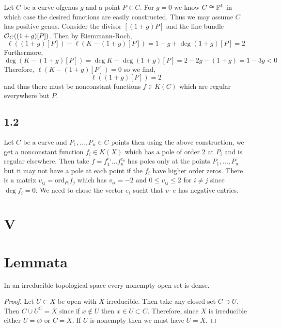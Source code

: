 \documentclass[12pt]{article}
\begin{document}
Let $C$ be a curve ofgenus $g$ and a point $P \in C$. For $g = 0$ we know $C \cong \P^1$ in which case the desired functions are easily constructed. Thus we may assume $C$ has positive genus. Consider the divisor $[(1 + g)P]$ and the line bundle $\struct{C}((1 + g)[P])$. Then by Riemmann-Roch,
\[ \ell((1 + g)[P]) - \ell(K - (1 + g)[P]) = 1 - g + \deg{(1 + g) [P]} = 2 \]
Furthermore,
\[ \deg{(K - (1+g)[P])} = \deg{K} - \deg{(1 + g)[P]} = 2 - 2g - (1 + g) = 1 - 3 g < 0 \]
Therefore, $\ell(K - (1 + g)[P]) = 0$ so we find,
\[ \ell((1 + g)[P]) = 2 \]
and thus there must be nonconstant functions $f \in K(C)$ which are regular everywhere but $P$. 

\subsection{1.2}

Let $C$ be a curve and $P_1, \dots, P_n \in C$ points then using the above construction, we get a nonconstant function $f_i \in K(X)$ which has a pole of order $2$ at $P_i$ and is regular elsewhere. Then take $f = f_1^{e_1} \dots f_n^{e_n}$ has poles only at the points $P_1, \dots, P_n$ but it may not have a pole at each point if the $f_i$ have higher order zeros. There is a matrix $v_{ij} = \mathrm{ord}_{P_i} f_j$ which has $v_{ii} = -2$ and $0 \le v_{ij} \le 2$ for $i \neq j$ since $\deg{f_i} = 0$. We need to chose the vector $e_i$ sucht that $v \cdot e$ has negative entries. 

\section{V}

\section{Lemmata}


\begin{lemma} \label{open_in_irreducible_is_dense}
In an irreducible topological space every nonempty open set is dense.
\end{lemma}

\begin{proof}
Let $U \subset X$ be open with $X$ irreducible. Then take any closed set $C \supset U$. Then $C \cup U^C = X$ since if $x \notin U$ then $x \in U \subset C$. Therefore, since $X$ is irreducible either $U = \varnothing$ or $C = X$. If $U$ is nonempty then we must have $\overline{U} = X$.  
\end{proof}
\end{document}
